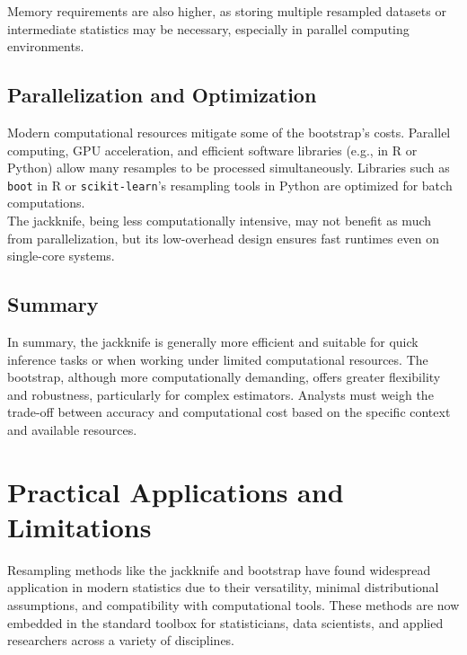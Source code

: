 \documentclass{article}
\begin{document}
Memory requirements are also higher, as storing multiple resampled datasets or intermediate statistics may be necessary, especially in parallel computing environments.\\

\subsection{Parallelization and Optimization}

Modern computational resources mitigate some of the bootstrap's costs. Parallel computing, GPU acceleration, and efficient software libraries (e.g., in R or Python) allow many resamples to be processed simultaneously. Libraries such as \texttt{boot} in R or \texttt{scikit-learn}'s resampling tools in Python are optimized for batch computations.\\

The jackknife, being less computationally intensive, may not benefit as much from parallelization, but its low-overhead design ensures fast runtimes even on single-core systems.\\

\subsection{Summary}

In summary, the jackknife is generally more efficient and suitable for quick inference tasks or when working under limited computational resources. The bootstrap, although more computationally demanding, offers greater flexibility and robustness, particularly for complex estimators. Analysts must weigh the trade-off between accuracy and computational cost based on the specific context and available resources.\\

\section{Practical Applications and Limitations}

Resampling methods like the jackknife and bootstrap have found widespread application in modern statistics due to their versatility, minimal distributional assumptions, and compatibility with computational tools. These methods are now embedded in the standard toolbox for statisticians, data scientists, and applied researchers across a variety of disciplines.\\
\end{document}
